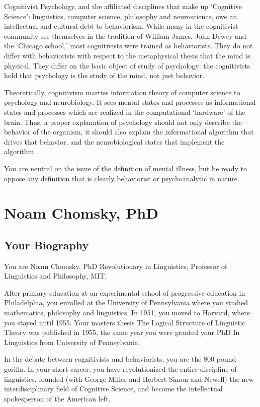 \begin{refsection}
Cognitivist Psychology, and the affiliated disciplines that make up `Cognitive Science': linguistics, computer science, philosophy and neuroscience, owe an intellectual and cultural debt to behaviorism. While many in the cognitivist community see themselves in the tradition of William James, John Dewey and the `Chicago school,' most cognitivists were trained as behaviorists. They do not differ with behaviorists with respect to the metaphysical thesis that the mind is physical. They differ on the basic object of study of psychology: the cognitivists hold that psychology is the study of the mind, not just behavior.

Theoretically, cognitivism marries information theory of computer science to psychology and neurobiology. It sees mental states and processes as informational states and processes which are realized in the computational `hardware' of the brain. Thus, a proper explanation of psychology should not only describe the behavior of the organism, it should also explain the informational algorithm that drives that behavior, and the neurobiological states that implement the algorithm.

You are neutral on the issue of the definition of mental illness, but be ready to oppose any definition that is clearly behaviorist or psychoanalytic in nature.

\chapter{Noam Chomsky, PhD}
\label{noamchomskyphd}

\section{Your Biography}
\label{yourbiography}

You are Noam Chomsky, PhD Revolutionary in Linguistics, Professor of Linguistics and Philosophy, MIT.

After primary education at an experimental school of progressive education in Philadelphia, you enrolled at the University of Pennsylvania where you studied mathematics, philosophy and linguistics. In 1951, you moved to Harvard, where you stayed until 1955. Your masters thesis The Logical Structure of Linguistic Theory was published in 1955, the same year you were granted your PhD In Linguistics from University of Pennsylvania.

In the debate between cognitivists and behaviorists, you are the 800 pound gorilla. In your short career, you have revolutionized the entire discipline of linguistics, founded (with George Miller and Herbert Simon and Newell) the new interdisciplinary field of Cognitive Science, and become the intellectual spokesperson of the American left.


\end{refsection}

